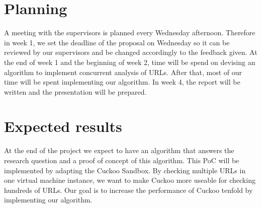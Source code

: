 \documentclass{scrartcl}
\begin{document}




\section{Planning}

A meeting with the supervisors is planned every Wednesday afternoon. Therefore in week 1, we set the deadline of the proposal on Wednesday so it can be reviewed by our supervisors and be changed accordingly to the feedback given. At the end of week 1 and the beginning of week 2, time will be spend on devising an algorithm to implement concurrent analysis of URLs. After that, most of our time will be spent implementing our algorithm. In week 4, the report will be written and the presentation will be prepared.

\section{Expected results}

At the end of the project we expect to have an algorithm that answers the research question and a proof of concept of this algorithm. This PoC will be implemented by adapting the Cuckoo Sandbox. By checking multiple URLs in one virtual machine instance, we want to make Cuckoo more useable for checking hundreds of URLs. Our goal is to increase the performance of Cuckoo tenfold by implementing our algorithm.
\end{document}
